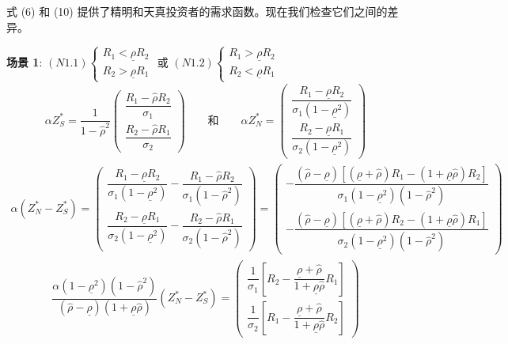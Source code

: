 \documentclass[10.0pt]{article}
\begin{document}
\quad 

式 (6) 和 (10) 提供了精明和天真投资者的需求函数。现在我们检查它们之间的差异。

{\bf 场景 1}: $ (N1.1) \left\{ \begin{matrix} R_1 < \underline{\rho} R_2 \\ R_2 > \underline{\rho} R_1 \end{matrix} \right. $ 或 $ (N1.2) \left\{ \begin{matrix} R_1 > \underline{\rho} R_2 \\ R_2 < \underline{\rho} R_1 \end{matrix} \right. $
\begin{eqnarray*}
\alpha Z_S^* = \dfrac1{1 - {\hat \rho}^2} \left( \begin{matrix} \dfrac{R_1 - {\hat \rho} R_2}{\sigma_1} \\ \dfrac{R_2 - {\hat \rho} R_1}{\sigma_2} \end{matrix} \right) \qquad \text{和} \qquad \alpha Z_N^* = \left( \begin{matrix} \dfrac{R_1 - \underline{\rho} R_2}{\sigma_1 (1 - \underline{\rho}^2)} \\ \dfrac{R_2 - \underline{\rho} R_1}{\sigma_2 (1 - \underline{\rho}^2)} \end{matrix} \right)
\end{eqnarray*}
\begin{eqnarray*}
\alpha (Z_N^* - Z_S^*) = \left( \begin{matrix} \dfrac{R_1 - \underline{\rho} R_2}{\sigma_1 (1 - \underline{\rho}^2)} - \dfrac{R_1 - {\hat \rho} R_2}{\sigma_1 (1 - {\hat \rho}^2)} \\ \dfrac{R_2 - \underline{\rho} R_1}{\sigma_2 (1 - \underline{\rho}^2)} - \dfrac{R_2 - {\hat \rho} R_1}{\sigma_2 (1 - {\hat \rho}^2)} \end{matrix} \right) = \left( \begin{matrix} - \dfrac{({\hat \rho} - \underline{\rho}) [(\underline{\rho} + {\hat \rho}) R_1 - (1 + \underline{\rho} {\hat \rho}) R_2]}{\sigma_1 (1 - \underline{\rho}^2) (1 - {\hat \rho}^2)} \\ - \dfrac{({\hat \rho} - \underline{\rho}) [(\underline{\rho} + {\hat \rho}) R_2 - (1 + \underline{\rho} {\hat \rho}) R_1]}{\sigma_2 (1 - \underline{\rho}^2) (1 - {\hat \rho}^2)} \end{matrix} \right)
\end{eqnarray*}
\begin{eqnarray*}
\dfrac{\alpha (1 - \underline{\rho}^2) (1 - {\hat \rho}^2)}{({\hat \rho} - \underline{\rho}) (1 + \underline{\rho} {\hat \rho})} (Z_N^* - Z_S^*) = \left( \begin{matrix} \dfrac{1}{\sigma_1} \left[ R_2 - \dfrac{\underline{\rho} + {\hat \rho}}{1 + \underline{\rho} {\hat \rho}} R_1 \right] \\ \dfrac{1}{\sigma_2} \left[ R_1 - \dfrac{\underline{\rho} + {\hat \rho}}{1 + \underline{\rho} {\hat \rho}} R_2 \right] \end{matrix} \right)
\end{eqnarray*}
\end{document}
